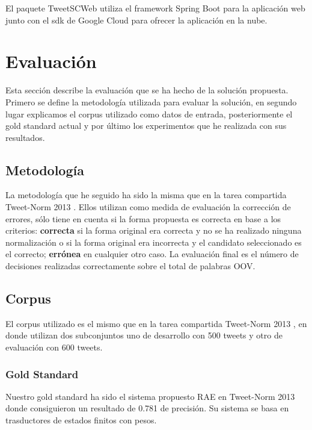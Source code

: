 \documentclass[spanish,12pt, a4paper,twoside]{paper}
\let\oldsection\section
\def\section{\cleardoublepage\oldsection}
\begin{document}
El paquete TweetSCWeb utiliza el framework Spring Boot para la aplicación web junto con el sdk de Google Cloud para ofrecer la aplicación en la nube.

\section{Evaluación}\label{sec:evaluacion}
Esta sección describe la evaluación que se ha hecho de la solución propuesta. Primero se define la metodología utilizada para evaluar la solución, en segundo lugar explicamos el corpus utilizado como datos de entrada, posteriormente el gold standard actual y por último los experimentos que he realizada con sus resultados.

\subsection{Metodología}\label{sec:metodologia}
La metodología que he seguido ha sido la misma que en la tarea compartida Tweet-Norm 2013 \cite{tweetnorm}. Ellos utilizan como medida de evaluación la corrección de errores, sólo tiene en cuenta si la forma propuesta es correcta en base a los criterios: \textbf{correcta} si la forma original era correcta y no se ha realizado ninguna normalización o si la forma original era incorrecta y el candidato seleccionado es el correcto; \textbf{errónea} en cualquier otro caso. La evaluación final es el número de decisiones realizadas correctamente sobre el total de palabras OOV.

\subsection{Corpus}\label{sec:corpus}
El corpus utilizado es el mismo que en la tarea compartida Tweet-Norm 2013 \cite{tweetnorm}, en donde utilizan dos subconjuntos uno de desarrollo con 500 tweets y otro de evaluación con 600 tweets.

\subsubsection{Gold Standard}\label{sec:goldstandard}
Nuestro gold standard ha sido el sistema propuesto RAE \cite{porta:2013} en Tweet-Norm 2013 \cite{tweetnorm} donde consiguieron un resultado de 0.781 de precisión. Su sistema se basa en trasductores de estados finitos con pesos. 
\end{document}
